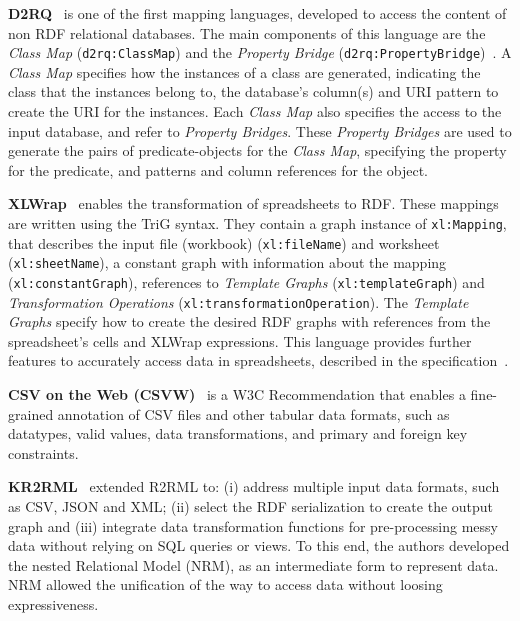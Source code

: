 \noindent\textbf{D2RQ}~\parencite{bizer2004d2rq} is one of the first mapping languages, developed to access the content of non RDF relational databases. The main components of this language are the \textit{Class Map} (\texttt{d2rq:ClassMap}) and the \textit{Property Bridge} (\texttt{d2rq:PropertyBridge})~\parencite{d2rq}. A \textit{Class Map} specifies how the instances of a class are generated, indicating the class that the instances belong to, the database's column(s) and URI pattern to create the URI for the instances. Each \textit{Class Map} also specifies the access to the input database, and refer to \textit{Property Bridges}. These \textit{Property Bridges} are used to generate the pairs of predicate-objects for the \textit{Class Map}, specifying the property for the predicate, and patterns and column references for the object. 


\noindent\textbf{XLWrap}~\parencite{langegger2009xlwrap} enables the transformation of spreadsheets to RDF. These mappings are written using the TriG syntax. They contain a graph instance of \texttt{xl:Mapping}, that describes the input file (workbook) (\texttt{xl:fileName}) and worksheet (\texttt{xl:sheetName}), a constant graph with information about the mapping (\texttt{xl:constantGraph}), references to \textit{Template Graphs} (\texttt{xl:templateGraph}) and \textit{Transformation Operations} (\texttt{xl:transformationOperation}). The \textit{Template Graphs} specify how to create the desired RDF graphs with references from the spreadsheet's cells and XLWrap expressions. This language provides further features to accurately access data in spreadsheets, described in the specification~\parencite{xlwrap}.  

\noindent\textbf{CSV on the Web (CSVW)}~\parencite{Tennison2015csvw} is a W3C Recommendation that enables a fine-grained annotation of CSV files and other tabular data formats, such as datatypes, valid values, data transformations, and primary and foreign key constraints. 

\noindent\textbf{KR2RML}~\parencite{slepicka2015kr2rml} extended R2RML to: (i) address multiple input data formats, such as CSV, JSON and XML; (ii) select the RDF serialization to create the output graph and (iii) integrate data transformation functions for pre-processing messy data without relying on SQL queries or views. To this end, the authors developed the nested Relational Model (NRM), as an intermediate form to represent data. NRM allowed the unification of the way to access data without loosing expressiveness. 

